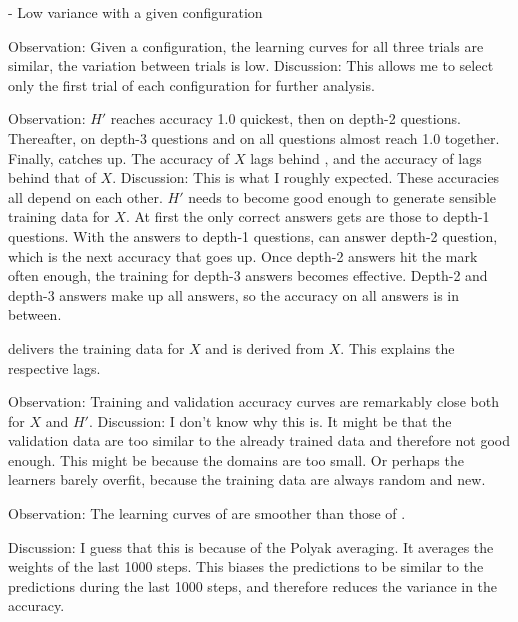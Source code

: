 \documentclass{farlamp}
\begin{document}
- Low variance with a given configuration

Observation: Given a configuration, the learning curves for all three trials are
similar, the variation between trials is low.
Discussion: This allows me to select only the first trial of each configuration
for further analysis.

Observation: $H'$ reaches accuracy 1.0 quickest, then \AmpHp on depth-2
questions. Thereafter, \AmpHp on depth-3 questions and on all questions almost
reach 1.0 together. Finally, \Xpa catches up. The accuracy of $X$ lags behind
\AmpHp, and the accuracy of \Xpa lags behind that of $X$.
Discussion: This is what I roughly expected. These accuracies all depend on each
other. $H'$ needs to become good enough to generate sensible training data for
$X$. At first the only correct answers \AmpHp gets are those to depth-1
questions. With the answers to depth-1 questions, \AmpHp can answer depth-2
question, which is the next accuracy that goes up. Once depth-2 answers hit the
mark often enough, the training for depth-3 answers becomes effective. Depth-2
and depth-3 answers make up all answers, so the accuracy on all answers is in
between.

\AmpHp delivers the training data for $X$ and \Xpa is derived from $X$. This
explains the respective lags.

Observation: Training and validation accuracy curves are remarkably close both
for $X$ and $H'$.
Discussion: I don't know why this is. \OQ It might be that the validation data
are too similar to the already trained data and therefore not good enough. This
might be because the domains are too small. Or perhaps the learners barely
overfit, because the training data are always random and new.

Observation: The learning curves of \Xpa are smoother than those of \AmpHp.
\begin{picrow}
\end{picrow}
Discussion: I guess that this is because of the Polyak averaging. It averages
the weights of the last 1000 steps. This biases the predictions to be similar to
the predictions during the last 1000 steps, and therefore reduces the variance
in the accuracy.
\end{document}
